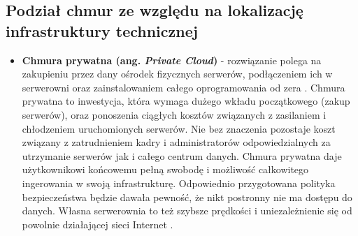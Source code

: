 \documentclass[10pt,a4paper,titlepage,twoside]{report}
\begin{document}
\subsection{Podział chmur ze względu na lokalizację infrastruktury technicznej}
\begin{itemize}
	\item \textbf{Chmura prywatna (ang. \textit{Private Cloud})} - rozwiązanie polega na zakupieniu przez dany ośrodek fizycznych serwerów, podłączeniem ich w serwerowni oraz zainstalowaniem całego oprogramowania od zera \cite{ad10}. Chmura prywatna to inwestycja, która wymaga dużego wkładu początkowego (zakup serwerów), oraz ponoszenia ciągłych kosztów związanych z zasilaniem i chłodzeniem uruchomionych serwerów. Nie bez znaczenia pozostaje koszt związany z zatrudnieniem kadry i administratorów odpowiedzialnych za utrzymanie serwerów jak i całego centrum danych. Chmura prywatna daje użytkownikowi końcowemu pełną swobodę i możliwość całkowitego ingerowania w swoją infrastrukturę. Odpowiednio przygotowana polityka bezpieczeństwa będzie dawała pewność, że nikt postronny nie ma dostępu do danych. Własna serwerownia to też szybsze prędkości i uniezależnienie się od powolnie działającej sieci Internet \cite{ad11}.

\end{itemize}
\end{document}
